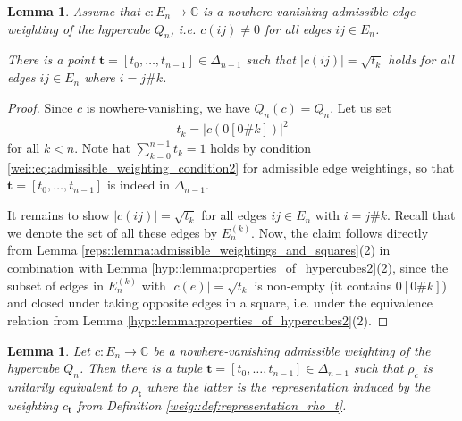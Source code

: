 \documentclass[a4paper]{amsart}
\newcommand{\C}{\mathbb{C}}
\newtheorem{lemma}[thm]{Lemma}
\begin{document}
\begin{lemma}
    \label{hyp::lemma:nonvanishing_admissible_weightings_are_almost_ct}
    Assume that $c: E_n \to \C$ is a nowhere-vanishing admissible edge weighting of the hypercube $Q_n$, i.e. $c(ij) \neq 0$ for all edges $ij \in E_n$. 
    
    There is a point $\mathbf{t} = [t_0, \dots, t_{n-1}] \in \Delta_{n-1}$ such that $|c(ij)| = \sqrt{t_k}$ holds for all edges $ij \in E_n$ where $i = j \# k$.
\end{lemma}

\begin{proof}
    Since $c$ is nowhere-vanishing, we have $Q_n(c) = Q_n$. Let us set
    \begin{align*}
        t_k = |c(0 [0 \# k])|^2
    \end{align*}
    for all $k < n$. Note hat $\sum_{k=0}^{n-1} t_k = 1$ holds by condition \eqref{wei::eq:admissible_weighting_condition2} for admissible edge weightings, so that $\mathbf{t} = [t_0, \dots, t_{n-1}]$ is indeed in $\Delta_{n-1}$.
    
    It remains to show $|c(ij)| = \sqrt{t_k}$ for all edges $ij \in E_n$ with $i = j \# k$. Recall that we denote the set of all these edges by $E_n^{(k)}$. Now, the claim follows directly from Lemma \ref{reps::lemma:admissible_weightings_and_squares}(2) in combination with Lemma \ref{hyp::lemma:properties_of_hypercubes2}(2), since the subset of edges in $E_n^{(k)}$ with $|c(e)| = \sqrt{t_k}$ is non-empty (it contains $0 [0 \# k]$) and closed under taking opposite edges in a square, i.e. under the equivalence relation from Lemma \ref{hyp::lemma:properties_of_hypercubes2}(2).
\end{proof}

\begin{lemma}
    \label{hyp::lemma:nonvanishing_admissible_weightings_are_unitarily_equivalent_to_ct}
    Let $c: E_n \to \C$ be a nowhere-vanishing admissible weighting of the hypercube $Q_n$. Then there is a tuple $\mathbf{t} = [t_0, \dots, t_{n-1}] \in \Delta_{n-1}$ such that $\rho_c$ is unitarily equivalent to $\rho_{\mathbf{t}}$ where the latter is the representation induced by the weighting $c_\mathbf{t}$ from Definition \ref{weig::def:representation_rho_t}. 
\end{lemma}
\end{document}
